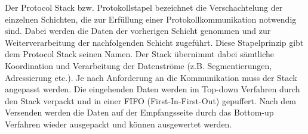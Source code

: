 Der Protocol Stack bzw. Protokollstapel bezeichnet die Verschachtelung der
einzelnen Schichten, die zur Erf{\"u}llung einer Protokollkommunikation
notwendig sind. Dabei werden die Daten der vorherigen Schicht genommen und zur
Weiterverarbeitung der nachfolgenden Schicht zugef{\"u}hrt. Diese Stapelprinzip
gibt dem Protocol Stack seinen Namen. Der Stack {\"u}bernimmt dabei
s{\"a}mtliche Koordination und Verarbeitung der Datenstr{\"o}me (z.B.
Segmentierungen, Adressierung etc.).
Je nach Anforderung an die Kommunikation muss der Stack angepasst werden. Die
eingehenden Daten werden im Top-down Verfahren durch den Stack verpackt
und in einer FIFO (First-In-First-Out) gepuffert. Nach dem Versenden werden die
Daten auf der Empfangsseite durch das Bottom-up Verfahren wieder ausgepackt und k{\"o}nnen
ausgewertet werden.
